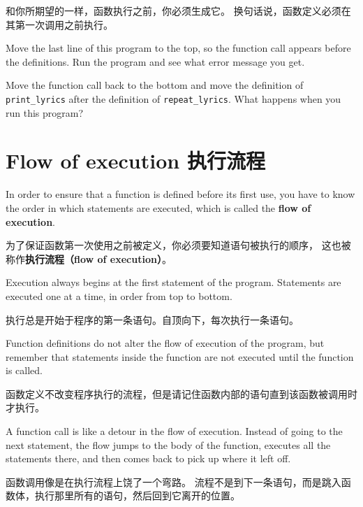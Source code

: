 \documentclass[10pt]{book}
\begin{document}
\begin{CJK}{UTF8}{gbsn}
和你所期望的一样，函数执行之前，你必须生成它。
换句话说，函数定义必须在其第一次调用之前执行。

\begin{exercise}

Move the last line of this program
to the top, so the function call appears before the definitions. Run 
the program and see what error
message you get.

\end{exercise}

\begin{exercise}

Move the function call back to the bottom
and move the definition of \verb"print_lyrics" after the definition of
\verb"repeat_lyrics".  What happens when you run this program?

\end{exercise}


\section{Flow of execution 执行流程}

In order to ensure that a function is defined before its first use,
you have to know the order in which statements are executed, which is
called the {\bf flow of execution}.

为了保证函数第一次使用之前被定义，你必须要知道语句被执行的顺序，
这也被称作{\bf 执行流程（flow of execution）}。

Execution always begins at the first statement of the program.
Statements are executed one at a time, in order from top to bottom.

执行总是开始于程序的第一条语句。自顶向下，每次执行一条语句。

Function definitions do not alter the flow of execution of the
program, but remember that statements inside the function are not
executed until the function is called.

函数定义不改变程序执行的流程，但是请记住函数内部的语句直到该函数被调用时才执行。

A function call is like a detour in the flow of execution. Instead of
going to the next statement, the flow jumps to the body of
the function, executes all the statements there, and then comes back
to pick up where it left off.

函数调用像是在执行流程上饶了一个弯路。
流程不是到下一条语句，而是跳入函数体，执行那里所有的语句，然后回到它离开的位置。


\end{CJK}
\end{document}

